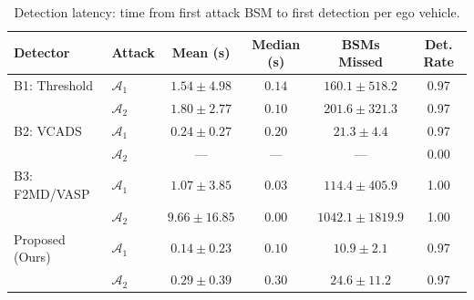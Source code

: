 \begin{table}[t]
\centering
\caption{Detection latency: time from first attack BSM to first detection per ego vehicle.}
\label{tab:latency}
\small
\begin{tabular}{@{}llcccc@{}}
\toprule
\textbf{Detector} & \textbf{Attack} & \textbf{Mean (s)} & \textbf{Median (s)} & \textbf{BSMs Missed} & \textbf{Det. Rate} \\
\midrule
B1: Threshold & $\mathcal{A}_1$ & $1.54 \pm 4.98$ & $0.14$ & $160.1 \pm 518.2$ & 0.97 \\
 & $\mathcal{A}_2$ & $1.80 \pm 2.77$ & $0.10$ & $201.6 \pm 321.3$ & 0.97 \\
\midrule
B2: VCADS & $\mathcal{A}_1$ & $0.24 \pm 0.27$ & $0.20$ & $21.3 \pm 4.4$ & 0.97 \\
 & $\mathcal{A}_2$ & --- & --- & --- & 0.00 \\
\midrule
B3: F2MD/VASP & $\mathcal{A}_1$ & $1.07 \pm 3.85$ & $0.03$ & $114.4 \pm 405.9$ & 1.00 \\
 & $\mathcal{A}_2$ & $9.66 \pm 16.85$ & $0.00$ & $1042.1 \pm 1819.9$ & 1.00 \\
\midrule
Proposed (Ours) & $\mathcal{A}_1$ & $0.14 \pm 0.23$ & $0.10$ & $10.9 \pm 2.1$ & 0.97 \\
 & $\mathcal{A}_2$ & $0.29 \pm 0.39$ & $0.30$ & $24.6 \pm 11.2$ & 0.97 \\
\bottomrule
\end{tabular}
\end{table}
